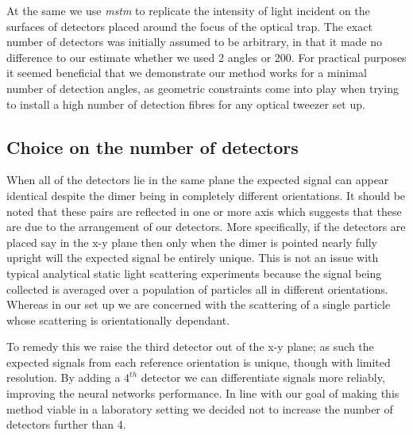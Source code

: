At the same we use \textit{mstm} to replicate the intensity of light
incident on the surfaces of detectors placed around the focus of the
optical trap. The exact number of detectors was initially assumed to 
be arbitrary, in that it made no difference to our estimate whether 
we used 2 angles or 200. For practical purposes it seemed beneficial 
that we demonstrate our method works for a minimal number of detection 
angles, as geometric constraints come into play when trying to install 
a high number of detection fibres for any optical tweezer set up.

\subsection{Choice on the number of detectors}
When all of the detectors lie in the same plane the expected signal 
can appear identical despite the dimer being in completely different orientations. It should be noted that these pairs are reflected in 
one or more axis which suggests that these are due to the arrangement 
of our detectors. More specifically, if the detectors are placed say 
in the x-y plane then only when the dimer is pointed nearly fully 
upright will the expected signal be entirely unique. This is not an 
issue with typical analytical static light scattering experiments 
because the signal being collected is averaged over a population of 
particles all in different orientations. Whereas in our set up we are concerned with the scattering of a single particle whose scattering is orientationally dependant. 

To remedy this we raise the third detector out of the x-y plane; 
as such the expected signals from each reference orientation is 
unique, though with limited resolution. By adding a $4^{th}$ 
detector we can differentiate signals more reliably, improving the 
neural networks performance. In line with our goal of making this 
method viable in a laboratory setting we decided not to increase 
the number of detectors further than 4. 

